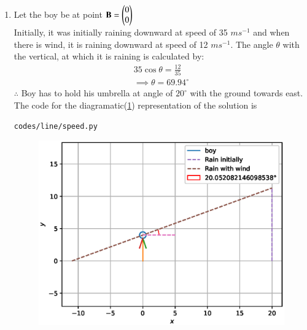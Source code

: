\renewcommand{\theequation}{\theenumi}
\begin{enumerate}[label=\arabic*.,ref=\thesubsubsection.\theenumi]
%
\item Let the boy be at point $\mathbf{B}=\begin{pmatrix}0\\0\end{pmatrix}$
\\
Initially, it was initially raining downward at speed of 35 $m s^{-1}$ and when there is wind, it is raining downward at speed of 12 $m s^{-1}$.
The angle $\theta$ with the vertical, at which it is raining is calculated by:
\begin{align}
35 \cos\theta=\frac{12}{35}
\\
\implies \theta=69.94^{\circ}
\end{align}  
$\therefore$ Boy has to hold his umbrella at angle of $20 ^{\circ}$ with the ground towards east.
\\
The code for the diagramatic(\ref{fig:speed}) representation of the solution is
\begin{lstlisting}
codes/line/speed.py
\end{lstlisting}
\begin{figure}[!ht]
\includegraphics[width=\columnwidth]{./figs/line/speed.eps}
\caption{}
\label{fig:speed}
\end{figure}
\end{enumerate}
